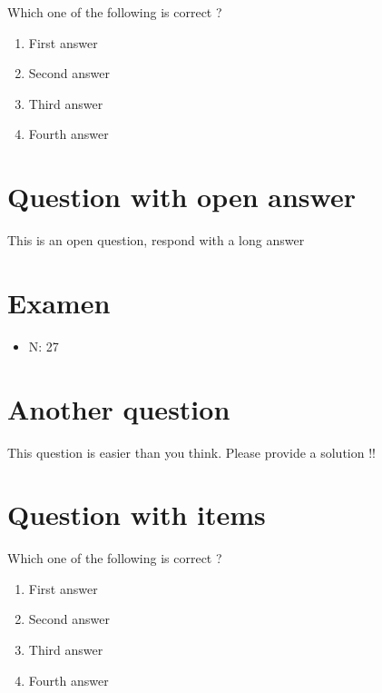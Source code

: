 \documentclass[a4paper,11pt,twoside]{article}
\begin{document}
Which one of the following is correct ?

\begin{enumerate}
\item First answer
\item Second answer
\item Third answer
\item Fourth answer
\end{enumerate}



\section*{Question with open answer}
\label{sec:org3a09330}

This is an open question, respond with a long answer


\subsection*{}
\label{sec:org695a7ca}

\cleardoublepage

\section*{Examen}
\label{sec:org69879f7}
\begin{itemize}
\item N: 27
\end{itemize}
\section*{Another question}
\label{sec:org879ffe6}

This question is easier than you think. Please provide a solution !!



\section*{Question with items}
\label{sec:org9df0d29}

Which one of the following is correct ?

\begin{enumerate}
\item First answer
\item Second answer
\item Third answer
\item Fourth answer
\end{enumerate}
\end{document}
